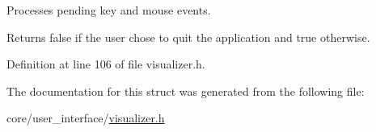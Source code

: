 Processes pending key and mouse events. 

\begin{DoxyReturn}{Returns}
{\ttfamily false} if the user chose to quit the application and {\ttfamily true} otherwise. 
\end{DoxyReturn}


Definition at line 106 of file visualizer.\+h.



The documentation for this struct was generated from the following file\+:\begin{DoxyCompactItemize}
\item 
core/user\+\_\+interface/\hyperlink{visualizer_8h}{visualizer.\+h}\end{DoxyCompactItemize}
